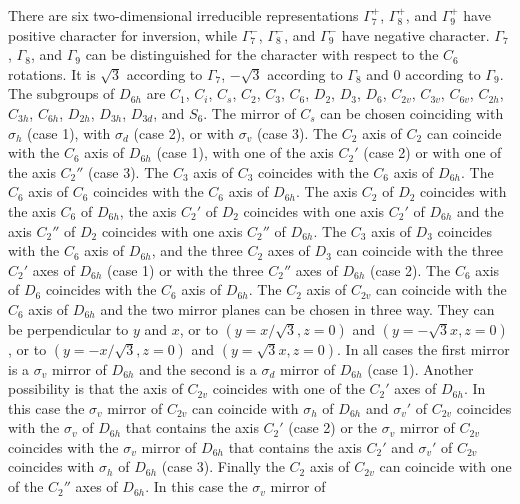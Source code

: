 \documentclass[12pt,a4paper,twoside]{report}
\begin{document}
There are six two-dimensional irreducible representations $\Gamma_7^+$,
$\Gamma_8^+$, and $\Gamma_9^+$ have positive character for inversion, while
$\Gamma_7^-$, $\Gamma_8^-$, and $\Gamma_9^-$ have negative character. 
$\Gamma_7$, $\Gamma_8$,
and $\Gamma_9$ can be distinguished for the character with respect to the $C_6$
rotations. It is $\sqrt{3}$ according to $\Gamma_7$, $-\sqrt{3}$ according
to $\Gamma_8$ and $0$ according to $\Gamma_9$.\\
The subgroups of $D_{6h}$ are $C_1$, $C_i$, $C_s$, $C_2$, $C_3$, $C_6$,
$D_2$, $D_3$, $D_6$, $C_{2v}$, $C_{3v}$, $C_{6v}$, $C_{2h}$, $C_{3h}$, 
$C_{6h}$, $D_{2h}$, $D_{3h}$, $D_{3d}$, and $S_6$. 
The mirror of $C_s$ can be chosen coinciding with $\sigma_h$ (case 1), 
with $\sigma_d$ (case 2), or with $\sigma_v$ (case 3). The $C_2$ axis of 
$C_2$ can coincide with the $C_6$ axis of $D_{6h}$ (case 1), with one 
of the axis $C_2'$ (case 2) or with one of the axis
$C_2''$ (case 3). The $C_3$ axis of $C_3$ coincides with the $C_6$ axis of 
$D_{6h}$. The $C_6$ axis of $C_6$ coincides with the $C_6$ axis of 
$D_{6h}$. The axis $C_2$ of $D_2$ coincides with the axis $C_6$ of $D_{6h}$,
the axis $C_2'$ of $D_2$ coincides with one axis $C_2'$ of $D_{6h}$ and
the axis $C_2''$ of $D_2$ coincides with one axis $C_2''$ of $D_{6h}$.
The $C_3$ axis of $D_3$ coincides with the $C_6$ axis of $D_{6h}$, and
the three $C_2$ axes of $D_3$ can coincide with the three $C_2'$ axes of
$D_{6h}$ (case 1) or with the three $C_2''$ axes of $D_{6h}$ (case 2). 
The $C_6$ axis of $D_6$ coincides with the $C_6$ axis of $D_{6h}$. The $C_2$ 
axis of $C_{2v}$ can coincide with the $C_6$ axis of $D_{6h}$ and the two 
mirror planes can be chosen in three way. They can be perpendicular to $y$ and $x$, 
or to $(y=x/\sqrt{3}, z=0)$ and $(y=-\sqrt{3} x, z=0)$, or to
$(y=-x/\sqrt{3}, z=0)$ and $(y=\sqrt{3} x, z=0)$. In all cases 
the first mirror is a $\sigma_v$ mirror of $D_{6h}$ and the
second is a $\sigma_d$ mirror of $D_{6h}$ (case 1). 
Another possibility is that the axis of $C_{2v}$ coincides
with one of the $C_2'$ axes of $D_{6h}$. In this case the $\sigma_v$ mirror
of $C_{2v}$ can coincide with $\sigma_h$ of $D_{6h}$ and 
$\sigma_v'$ of $C_{2v}$ coincides with the $\sigma_v$ of $D_{6h}$ 
that contains the axis $C_2'$ (case 2) or the $\sigma_v$ mirror
of $C_{2v}$ coincides with the $\sigma_v$ mirror of $D_{6h}$ 
that contains the axis $C_2'$ and $\sigma_v'$ of $C_{2v}$ coincides 
with $\sigma_h$ of $D_{6h}$ (case 3). 
Finally the $C_2$ axis of $C_{2v}$ can coincide
with one of the $C_2''$ axes of $D_{6h}$. In this case the $\sigma_v$ mirror of
\end{document}
